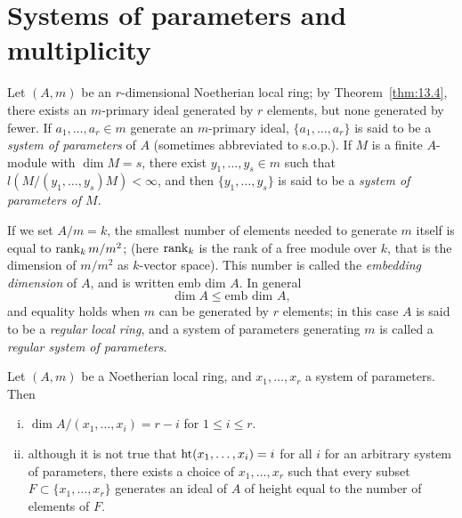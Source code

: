 \section{Systems of parameters and multiplicity}\label{sec:14}

Let $(A, m)$ be an $r$-dimensional Noetherian local ring; by Theorem~\ref{thm:13.4}, there exists an $m$-primary ideal generated by $r$ elements, but none
generated by fewer. If $a_1, \ldots, a_r \in m$ generate an $m$-primary ideal,
$\{a_1, \ldots, a_r\}$ is said to be a \emph{system of parameters} of $A$ (sometimes
abbreviated to s.o.p.). If $M$ is a finite $A$-module with $\dim M = s$, there exist
$y_1, \ldots, y_s \in m$ such that $l(M/(y_1, \ldots, y_s)M) < \infty$, and then $\{y_1, \ldots, y_s\}$ is
said to be a \emph{system of parameters of $M$}.

If we set $A/m = k$, the smallest number of elements needed to generate
$m$ itself is equal to $\operatorname{rank}_k m/m^2$; (here $\operatorname{rank}_k$ is the rank of a free module
over $k$, that is the dimension of $m/m^2$ as $k$-vector space). This number is
called the \emph{embedding dimension} of $A$, and is written emb dim $A$. In general
\[
  \dim A \le \text{emb dim } A,
\]
and equality holds when $m$ can be generated by $r$ elements; in this case
$A$ is said to be a \emph{regular local ring}, and a system of parameters generating
$m$ is called a \emph{regular system of parameters}.

\begin{theorem}\label{thm:14.1}
Let $(A, m)$ be a Noetherian local ring, and $x_1, \ldots, x_r$ a system
of parameters. Then
\begin{enumerate}[(i)]
  \item $\dim A/(x_1, \ldots, x_i) = r - i$ for $1 \le i \le r$.
  \item although it is not true that $\operatorname{ht} (x_1, \ldots, x_i) = i$ for all $i$ for an arbitrary
        system of parameters, there exists a choice of $x_1, \ldots, x_r$ such that every
        subset $F \subset \{x_1, \ldots, x_r\}$ generates an ideal of $A$ of height equal to the
        number of elements of $F$.
\end{enumerate}
\end{theorem}

